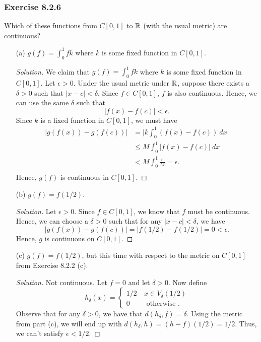 \subsubsection{Exercise 8.2.6} Which of these functions from \( C[0,1] \) to \( \mathbb{R}  \) (with the usual metric) are continuous? 
\begin{enumerate}
    \item[(a)] \( g(f) = \int_{ 0 }^{ 1 } f k  \) where \( k   \) is some fixed function in \( C[0,1]  \).
        \begin{proof}[Solution]
            We claim that \( g(f) = \int_{ 0 }^{ 1 }  fk  \) where \(  k  \) is some fixed function in \( C[0,1] \). Let \( \epsilon > 0  \). Under the usual metric under \( \mathbb{R}  \), suppose there exists a \( \delta > 0  \) such that \( | x -c  | < \delta  \). Since \( f \in C[0,1]  \), \( f  \) is also continuous. Hence, we can use the same \( \delta \) such that 
            \[  | f(x) - f(c)  | < \epsilon. \] Since \( k  \) is a fixed function in \( C[0,1]  \), we must have 
            \begin{align*}
                | g(f(x)) - g(f(c))  | &= \Big| k \int_{ 0 }^{ 1 } ( f(x) - f(c))  \ dx   \Big| \\
                                       &\leq M \int_{ 0 }^{ 1 }  | f(x) - f(c)  | \ dx \tag{\( k  \) is bounded} \\
                                       &< M \int_{ 0 }^{ 1 }  \frac{ \epsilon  }{ M   }  = \epsilon. \\ 
            \end{align*}
            Hence, \( g(f)  \) is continuous in \( C[0,1] \).
        \end{proof}
    \item[(b)] \( g(f) = f(1/2) \).
        \begin{proof}[Solution]
            Let \( \epsilon > 0   \). Since \( f \in C[0,1] \), we know that \( f  \) must be continuous. Hence, we can choose a \( \delta > 0  \) such that for any \( | x -c  | < \delta  \), we have
            \[  | g(f(x)) - g(f(c))  | = | f(1/2) - f(1/2)  | = 0 < \epsilon. \]
            Hence, \( g  \) is continuous on \( C[0,1] \).
        \end{proof}
    \item[(c)] \( g(f) = f(1/2)  \), but this time with respect to the metric on \( C[0,1]  \) from Exercise 8.2.2 (c).
        \begin{proof}[Solution]
        Not continuous. Let \( f = 0  \) and let \( \delta >0  \). Now define 
        \[  h_{\delta}(x) = 
        \begin{cases}
            1 /2 \ & x \in V_{\delta}(1/2) \\ 
            0 \ &\text{ otherwise }.
        \end{cases} \]
        Observe that for any \( \delta > 0  \), we have that \( d(h_{\delta}, f ) = \delta \). Using the metric from part (c), we will end up with \( d(h_{\delta}, h)= (h-f) (1/2) = 1/2   \). Thus, we can't satisfy \( \epsilon < 1/2. \)
        \end{proof}
\end{enumerate}


